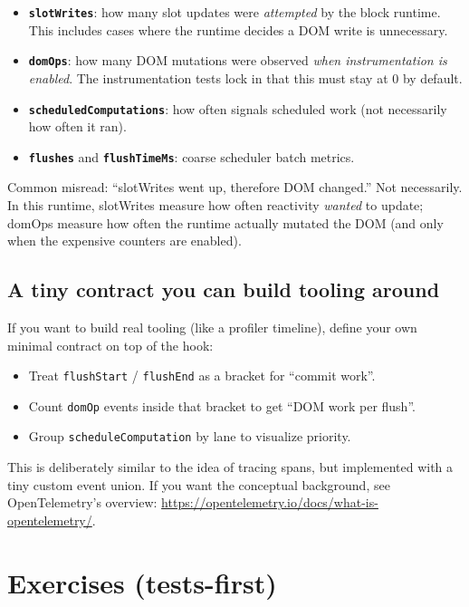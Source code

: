 \begin{itemize}
\item \textbf{\texttt{slotWrites}}: how many slot updates were \emph{attempted} by the block runtime.
	This includes cases where the runtime decides a DOM write is unnecessary.
\item \textbf{\texttt{domOps}}: how many DOM mutations were observed \emph{when instrumentation is enabled}.
	The instrumentation tests lock in that this must stay at 0 by default.
\item \textbf{\texttt{scheduledComputations}}: how often signals scheduled work (not necessarily how often it ran).
\item \textbf{\texttt{flushes}} and \textbf{\texttt{flushTimeMs}}: coarse scheduler batch metrics.
\end{itemize}

Common misread: ``slotWrites went up, therefore DOM changed.''
Not necessarily.
In this runtime, slotWrites measure how often reactivity \emph{wanted} to update; domOps measure how often the runtime actually mutated the DOM (and only when the expensive counters are enabled).

\subsection{A tiny contract you can build tooling around}

If you want to build real tooling (like a profiler timeline), define your own minimal contract on top of the hook:

\begin{itemize}
\item Treat \texttt{flushStart} / \texttt{flushEnd} as a bracket for ``commit work''.
\item Count \texttt{domOp} events inside that bracket to get ``DOM work per flush''.
\item Group \texttt{scheduleComputation} by lane to visualize priority.
\end{itemize}

This is deliberately similar to the idea of tracing spans, but implemented with a tiny custom event union.
If you want the conceptual background, see OpenTelemetry's overview:
\href{https://opentelemetry.io/docs/what-is-opentelemetry/}{https://opentelemetry.io/docs/what-is-opentelemetry/}.

\section{Exercises (tests-first)}

